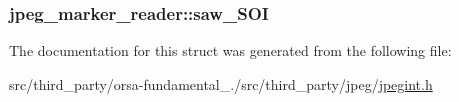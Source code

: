\subsubsection[{saw\+\_\+\+S\+O\+I}]{ jpeg\+\_\+marker\+\_\+reader\+::saw\+\_\+\+S\+O\+I}\label{structjpeg__marker__reader_ad67711d91054e97e76fbe5254aac644c}


The documentation for this struct was generated from the following file\+:\begin{DoxyCompactItemize}
\item 
src/third\+\_\+party/orsa-\/fundamental\+\_./src/third\+\_\+party/jpeg/\hyperlink{jpegint_8h}{jpegint.\+h}\end{DoxyCompactItemize}
